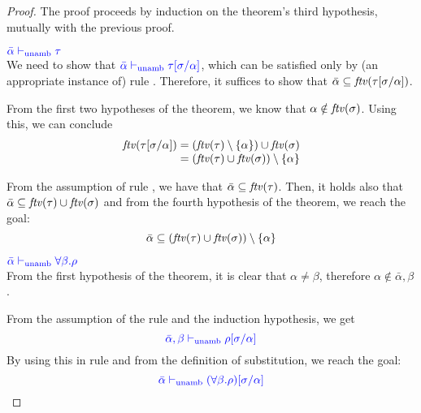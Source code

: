 \begin{proof}
The proof proceeds by induction on the theorem's third hypothesis, mutually with the previous
proof.\\

\item[\fbox{\rref{UA-Simp}}]\quad${\color{blue} \bar{\alpha} \vdash_{\mathrm{unamb}} \tau}$\\
We need to show that ${\color{blue} \bar\alpha \vdash_{\mathrm{unamb}} \tau[\sigma/\alpha]}$, which can be satisfied only
by (an appropriate instance of) rule . Therefore, it suffices to show that
$\bar\alpha\subseteq{\it ftv }(\tau[\sigma/\alpha])$.

From the first two hypotheses of the theorem, we know that $\alpha\notin{\it ftv }(\sigma)$. Using this,
we can conclude
\begin{equation*}
\arraycolsep=1.4pt\def\arraystretch{1}
\begin{array}{rl}
\ftv{\tau[\suty/\alpha]}&=(\ftv{\tau}\setminus\{\alpha\})\cup\ftv{\suty}\\
                        &=(\ftv{\tau}\cup\ftv{\suty})\setminus\{\alpha\}
\end{array}
\end{equation*}

From the assumption of rule , we have that $\bar\alpha\subseteq{\it ftv }(\tau)$.
Then, it holds also that $\bar\alpha\subseteq{\it ftv }(\tau)\cup{\it ftv }(\sigma)$ and from the fourth
hypothesis of the theorem, we reach the goal:
\begin{equation*}
\bar\alpha\subseteq({\it ftv }(\tau)\cup{\it ftv }(\sigma))\setminus\{\alpha\}
\end{equation*}

\item[\fbox{\rref{UA-TAbs}}]\quad${\color{blue} \bar{\alpha} \vdash_{\mathrm{unamb}} \forall \beta. \rho}$\\
From the first hypothesis of the theorem, it is clear that $\alpha\neq\beta$, therefore
$\alpha\notin\bar\alpha,\beta$.

From the assumption of the rule and the induction hypothesis, we get
\begin{equation*}
{\color{blue} \bar{\alpha},\beta \vdash_{\mathrm{unamb}}\rho[\sigma/\alpha]}
\end{equation*}
By using this in rule  and from the definition of substitution, we reach the goal:
\begin{equation*}
{\color{blue} \bar{\alpha} \vdash_{\mathrm{unamb}}(\forall \beta. \rho)[\sigma/\alpha]}
\end{equation*}


\end{proof}
